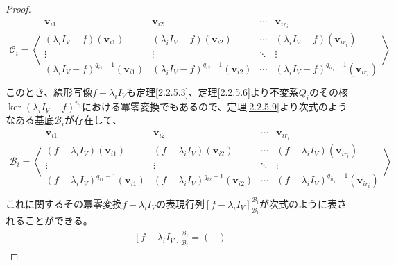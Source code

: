 \documentclass[dvipdfmx]{jsarticle}
\begin{document}
\begin{proof}
\begin{align*}
\mathcal{C}_{i} = \left\langle \begin{matrix}
\mathbf{v}_{i1} & \mathbf{v}_{i2} & \cdots & \mathbf{v}_{ir_{i}} \\
\left( \lambda_{i}I_{V} - f \right)\left( \mathbf{v}_{i1} \right) & \left( \lambda_{i}I_{V} - f \right)\left( \mathbf{v}_{i2} \right) & \cdots & \left( \lambda_{i}I_{V} - f \right)\left( \mathbf{v}_{ir_{i}} \right) \\
 \vdots & \vdots & \ddots & \vdots \\
\left( \lambda_{i}I_{V} - f \right)^{q_{i1} - 1}\left( \mathbf{v}_{i1} \right) & \left( \lambda_{i}I_{V} - f \right)^{q_{i2} - 1}\left( \mathbf{v}_{i2} \right) & \cdots & \left( \lambda_{i}I_{V} - f \right)^{q_{ir_{i}} - 1}\left( \mathbf{v}_{ir_{i}} \right) \\
\end{matrix} \right\rangle
\end{align*}
このとき、線形写像$f - \lambda_{i}I_{V}$も定理\ref{2.2.5.3}、定理\ref{2.2.5.6}より不変系$Q_{i}$のその核$\ker\left( \lambda_{i}I_{V} - f \right)^{n_{i}}$における冪零変換でもあるので、定理\ref{2.2.5.9}より次式のようなある基底$\mathcal{B}_{i}$が存在して、
\begin{align*}
\mathcal{B}_{i} = \left\langle \begin{matrix}
\mathbf{v}_{i1} & \mathbf{v}_{i2} & \cdots & \mathbf{v}_{ir_{i}} \\
\left( f - \lambda_{i}I_{V} \right)\left( \mathbf{v}_{i1} \right) & \left( f - \lambda_{i}I_{V} \right)\left( \mathbf{v}_{i2} \right) & \cdots & \left( f - \lambda_{i}I_{V} \right)\left( \mathbf{v}_{ir_{i}} \right) \\
 \vdots & \vdots & \ddots & \vdots \\
\left( f - \lambda_{i}I_{V} \right)^{q_{i1} - 1}\left( \mathbf{v}_{i1} \right) & \left( f - \lambda_{i}I_{V} \right)^{q_{i2} - 1}\left( \mathbf{v}_{i2} \right) & \cdots & \left( f - \lambda_{i}I_{V} \right)^{q_{ir_{i}} - 1}\left( \mathbf{v}_{ir_{i}} \right) \\
\end{matrix} \right\rangle
\end{align*}
これに関するその冪零変換$f - \lambda_{i}I_{V}$の表現行列$\left[ f - \lambda_{i}I_{V} \right]_{\mathcal{B}_{i}}^{\mathcal{B}_{i}}$が次式のように表されることができる。
\begin{align*}
\left[ f - \lambda_{i}I_{V} \right]_{\mathcal{B}_{i}}^{\mathcal{B}_{i}} = \begin{pmatrix}

\end{pmatrix}
\end{align*}
\end{proof}
\end{document}
